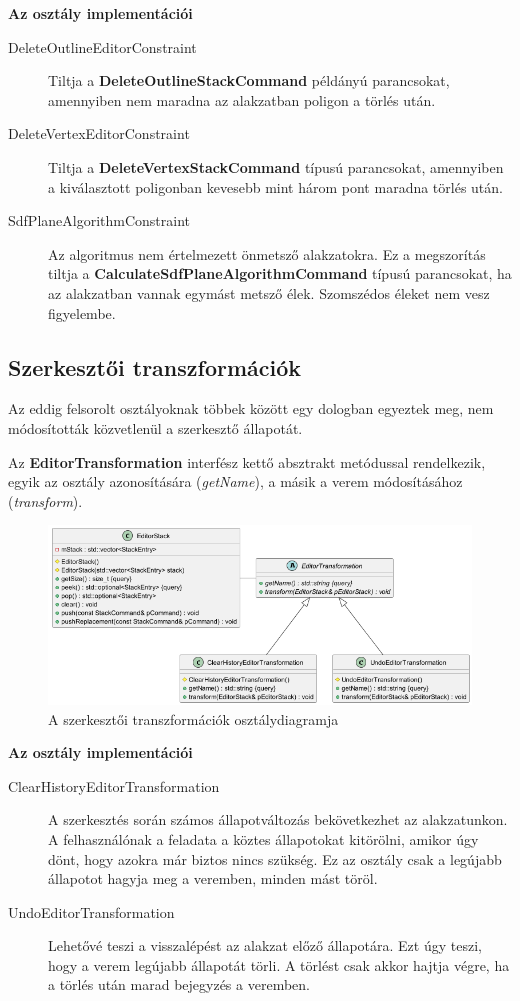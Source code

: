 \textbf{Az osztály implementációi}

\begin{description}
    \item[DeleteOutlineEditorConstraint] Tiltja a \textbf{DeleteOutlineStackCommand} példányú parancsokat, amennyiben nem maradna az alakzatban poligon a törlés után.
    \item[DeleteVertexEditorConstraint] Tiltja a \textbf{DeleteVertexStackCommand} típusú parancsokat, amennyiben a kiválasztott poligonban kevesebb mint három pont maradna törlés után.
    \item[SdfPlaneAlgorithmConstraint] Az algoritmus nem értelmezett önmetsző alakzatokra. Ez a megszorítás tiltja a \textbf{CalculateSdfPlaneAlgorithmCommand} típusú parancsokat, ha az alakzatban vannak egymást metsző élek. Szomszédos éleket nem vesz figyelembe.
\end{description}

\subsection{Szerkesztői transzformációk}

Az eddig felsorolt osztályoknak többek között egy dologban egyeztek meg, nem módosították közvetlenül a szerkesztő állapotát.

Az \textbf{EditorTransformation} interfész kettő absztrakt metódussal rendelkezik, egyik az osztály azonosítására (\textit{getName}), a másik a verem módosításához (\textit{transform}).

\begin{figure}[H]
    \centering
    \includegraphics[width=1\linewidth]{images/class_editor_transformation.png}
    \caption{A szerkesztői transzformációk osztálydiagramja}
    \label{fig:class_editor_transformation-1}
\end{figure}

\textbf{Az osztály implementációi}

\begin{description}
    \item[ClearHistoryEditorTransformation] A szerkesztés során számos állapotváltozás bekövetkezhet az alakzatunkon. A felhasználónak a feladata a köztes állapotokat kitörölni, amikor úgy dönt, hogy azokra már biztos nincs szükség. Ez az osztály csak a legújabb állapotot hagyja meg a veremben, minden mást töröl.
    \item[UndoEditorTransformation] Lehetővé teszi a visszalépést az alakzat előző állapotára. Ezt úgy teszi, hogy a verem legújabb állapotát törli. A törlést csak akkor hajtja végre, ha a törlés után marad bejegyzés a veremben.
\end{description}


